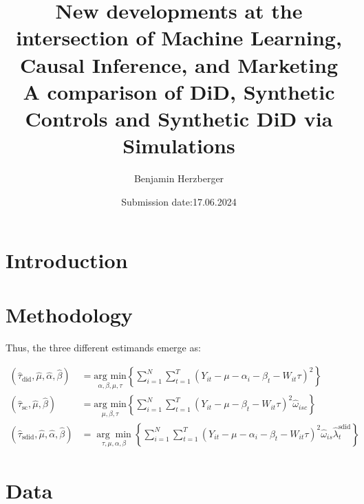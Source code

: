 \documentclass[a4paper, 12pt]{article}
\title{New developments at the intersection of Machine Learning, Causal Inference, and Marketing\\
\vspace{0.5cm}
\large A comparison of DiD, Synthetic Controls and Synthetic DiD via Simulations}
\date{Submission date:17.06.2024}
\author{Benjamin Herzberger}
\begin{document}
\sectionfont{\large}
\subsectionfont{\normalsize}
\maketitle
\singlespacing
\newpage
{}

\section{Introduction}

\section{Methodology}

Thus, the three different estimands emerge as:


\begin{equation*}
\begin{aligned}
(\hat{\tau}_{\text{did}}, \hat{\mu}, \hat{\alpha}, \hat{\beta}) &= \underset{\alpha, \beta, \mu, \tau}{\text{arg min}} \left\{ \sum_{i=1}^{N} \sum_{t=1}^{T} \left( Y_{it} - \mu - \alpha_i - \beta_t - W_{it} \tau \right)^2 \right\} \\
(\hat{\tau}_{\text{sc}}, \hat{\mu}, \hat{\beta}) &= \underset{\mu, \beta, \tau}{\text{arg min}} \left\{ \sum_{i=1}^{N} \sum_{t=1}^{T} \left( Y_{it} - \mu - \beta_t - W_{it} \tau \right)^2 \hat{\omega}_{isc} \right\} \\
(\hat{\tau}_{\text{sdid}}, \hat{\mu}, \hat{\alpha}, \hat{\beta}) &= \underset{\tau, \mu, \alpha, \beta}{\arg\min} \left\{ \sum_{i=1}^{N} \sum_{t=1}^{T} \left( Y_{it} - \mu - \alpha_i - \beta_t - W_{it} \tau \right)^2 \hat{\omega}_{is} \hat{\lambda}_t^{\text{sdid}} \right\}
\end{aligned}
\end{equation*}






\section{Data}
\end{document}
